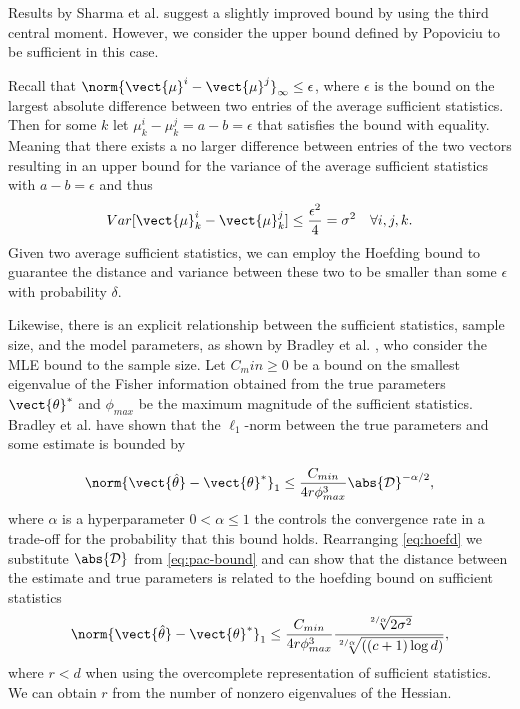 Results by Sharma et al. \cite{sharma2010betterbounds} suggest a slightly improved bound by using the third central moment.
However, we consider the upper bound defined by Popoviciu to be sufficient in this case.



Recall that $\norm{\vect{\mu}^{i} -  \vect{\mu}^{j}}_\infty \leq  \epsilon$, where $\epsilon$ is the bound on the largest absolute difference between two entries of the average sufficient statistics. 
Then for some $k$ let  $\mu^{i}_k - \mu^{j}_k = a - b  = \epsilon$ that satisfies the bound with equality.
Meaning that there exists a no larger difference between entries of the two vectors resulting in an upper bound for the variance of the average sufficient statistics with $a - b = \epsilon$ and thus
\begin{equation*}
    Var[\vect{\mu}^{i}_k -  \vect{\mu}^{j}_k] \leq \frac{\epsilon^2}{4} = \sigma^2 \quad \forall i,j,k.
\end{equation*}
Given two average sufficient statistics, we can employ the Hoefding bound to guarantee the distance and variance between these two to be smaller than some $\epsilon$ with probability $\delta$.

Likewise, there is an explicit relationship between the sufficient statistics, sample size, and the model parameters, as shown by Bradley et al. \cite{bradley2012sample}, who consider the MLE bound \wrt to the sample size. 
Let $C_min \geq 0$ be a bound on the smallest eigenvalue of the Fisher information obtained from the true parameters $\vect{\theta}^*$ and $\phi_{max}$ be the maximum magnitude of the sufficient statistics. 
Bradley et al. have shown that the $\ell_1$-norm between the true parameters and some estimate is bounded by 

\begin{equation}
    \label{eq:pac-bound}
    \norm{\vect{\hat{\theta}}- \vect{\theta}^*}_1 \leq \frac{C_{min}}{4r\phi^3_{max}} \abs{\mathcal{D}}^{-\alpha/2},
\end{equation}
where $\alpha$ is a hyperparameter $0 < \alpha \leq 1$ the controls the convergence rate in a trade-off for the probability that this bound holds. 
Rearranging \autoref{eq:hoefd} we substitute $\abs{\mathcal{D}}$ from \autoref{eq:pac-bound} and can show that the distance between the estimate and true parameters is related to the hoefding bound on sufficient statistics
\begin{equation}
    \norm{\vect{\hat{\theta}}- \vect{\theta}^*}_1 \leq \frac{C_{min}}{4r\phi^3_{max}} \frac{\sqrt[2/\alpha]{2\sigma^2}}{\sqrt[2/\alpha]{((c+1) \log d)}},
\end{equation}
where $r < d$ when using the overcomplete representation of sufficient statistics.
We can obtain $r$ from the number of nonzero eigenvalues of the Hessian.

